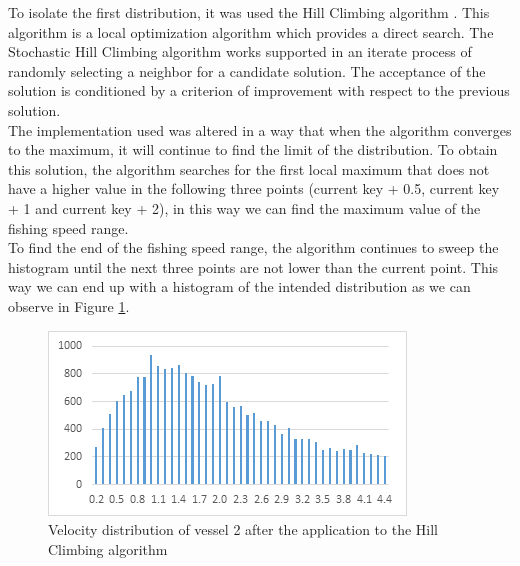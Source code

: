 To isolate the first distribution, it was used the Hill Climbing algorithm \cite{Kvasnicka1995HillCW}.  This algorithm is a local optimization algorithm which provides a direct search. The Stochastic Hill Climbing algorithm works supported in an iterate process of randomly selecting a neighbor for a candidate solution. The acceptance of the solution is conditioned by a criterion of improvement with respect to the previous solution.\\
The implementation used was altered in a way that when the algorithm converges to the maximum, it will continue to find the limit of the distribution.
To obtain this solution, the algorithm searches for the first local maximum that does not have a higher value in the following three points (current key + 0.5, current key + 1 and current key + 2), in this way we can find the maximum value of the fishing speed range. \\
To find the end of the fishing speed range, the algorithm continues to sweep the histogram until the next three points are not lower than the current point.
This way we can end up with a histogram of the intended distribution as we can observe in Figure  \ref{fig:sog_hill_climbing}.

\begin{figure}[H]
    \centering
    \includegraphics[width=0.8\linewidth]{Chapters/img/sog_hill_climbing.png}
    \caption{Velocity distribution of vessel 2 after the application to the Hill Climbing algorithm}
    \label{fig:sog_hill_climbing}
\end{figure}


